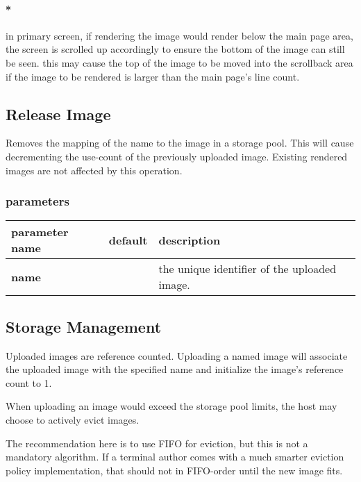 \documentclass[a4paper]{article}
\begin{document}

\paragraph{*}
in primary screen, if rendering the image would render below the main page area,
the screen is scrolled up accordingly to ensure the bottom of the image can still be seen.
this may cause the top of the image to be moved into the scrollback area
if the image to be rendered is larger than the main page's line count.

\subsection{Release Image} %

Removes the mapping of the name to the image in a storage pool.
This will cause decrementing the use-count of the previously uploaded image.
Existing rendered images are not affected by this operation.

\subsubsection*{parameters}

\begin{tabular}{|l|l|l|}
    \hline
    \textbf{parameter name} & \textbf{default} & \textbf{description} \\
    \hline
    \textbf{name}           &                  & the unique identifier of the uploaded image. \\
    \hline
\end{tabular}

\subsection{Storage Management} %

Uploaded images are reference counted.
Uploading a named image will associate the uploaded image with the specified
name and initialize the image's reference count to 1.

When uploading an image would exceed the storage pool limits,
the host may choose to actively evict images.

The recommendation here is to use FIFO for eviction,
but this is not a mandatory algorithm.
If a terminal author comes with a much smarter eviction policy implementation,
that should not in FIFO-order until the new image fits.
\end{document}
